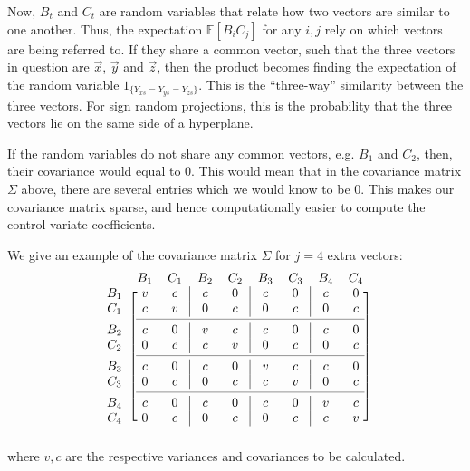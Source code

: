 \documentclass[runningheads]{llncs}
\newcommand{\e}{\mathbb{E}}
\begin{document}
    Now, $B_t$ and $C_t$ are random variables that relate how two vectors are similar to one another. Thus, the expectation $\e[B_iC_j]$ for any $i,j$ rely on which vectors are being referred to. If they share a common vector, such that the three vectors in question are $\vec{x}$, $\vec{y}$ and $\vec{z}$, then the product becomes finding the expectation of the random variable $1_{\{Y_{xs} = Y_{ys} = Y_{zs}\}}$. This is the ``three-way'' similarity between the three vectors. For sign random projections, this is the probability that the three vectors lie on the same side of a hyperplane.
    
    If the random variables do not share any common vectors, e.g. $B_1$ and $C_2$, then, their covariance would equal to 0. This would mean that in the covariance matrix $\Sigma$ above, there are several entries which we would know to be 0. This makes our covariance matrix sparse, and hence computationally easier to compute the control variate coefficients.
    
We give an example of the covariance matrix $\Sigma$ for $j=4$ extra vectors:
    \begin{equation}
        \begin{blockarray}{ccccccccc}
            & B_1 & C_1 & B_2 & C_2 & B_3 & C_3 & B_4 & C_4\\
            \begin{block}{c[cc|cc|cc|cc]}
                B_1 & v & c & c & 0 & c & 0 & c & 0 \\
                C_1 & c & v & 0 & c & 0 & c & 0 & c \\
                \cmidrule(lr){2-9}
                B_2 & c & 0 & v & c & c & 0 & c & 0 \\
                C_2 & 0 & c & c & v & 0 & c & 0 & c \\
                \cmidrule(lr){2-9}
                B_3 & c & 0 & c & 0 & v & c & c & 0 \\
                C_3 & 0 & c & 0 & c & c & v & 0 & c \\
                \cmidrule(lr){2-9}
                B_4 & c & 0 & c & 0 & c & 0 & v & c \\
                C_4 & 0 & c & 0 & c & 0 & c & c & v \\
            \end{block}
        \end{blockarray}
    \end{equation}
    where $v, c$ are the respective variances and covariances to be calculated.
    
\end{document}
